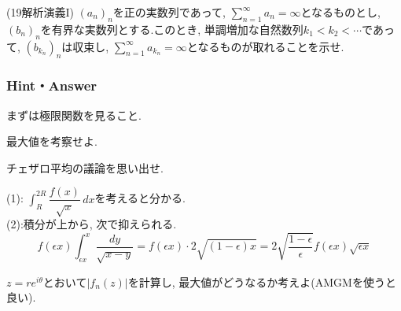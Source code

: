 \begin{prob} (19解析演義I)
$(a_n)_{n}$を正の実数列であって, $\sum_{n=1}^{\infty}a_n = \infty$となるものとし, $(b_n)_{n}$を有界な実数列とする.このとき, 単調増加な自然数列$k_1<k_2<\cdots$であって, $(b_{k_n})_{n}$は収束し, $\sum_{n=1}^{\infty}a_{k_n} = \infty$となるものが取れることを示せ.
\end{prob}

\newpage
\subsubsection{Hint・Answer}

{\small
\begin{probans}
まずは極限関数を見ること.
\end{probans}
\begin{probans}
最大値を考察せよ.
\end{probans}
\begin{probans}
チェザロ平均の議論を思い出せ.
\end{probans}
\begin{probans}
(1): $\int_{R}^{2R}\dfrac{f(x)}{\sqrt{x}}\, dx$を考えると分かる. \\
(2):積分が上から, 次で抑えられる.
\[f(\epsilon x) \int_{\epsilon x}^{x} \dfrac{dy}{\sqrt{x-y}} = f(\epsilon x)\cdot 2\sqrt{(1-\epsilon)x} = 2\sqrt{\frac{1-\epsilon}{\epsilon}}f(\epsilon x)\sqrt{\epsilon x}\]
\end{probans}




\begin{probans}
\end{probans}
\begin{probans}
\end{probans}
\begin{probans} %
\end{probans}

\begin{probans} %
$z=re^{i\theta}$とおいて$|f_n(z)|$を計算し, 最大値がどうなるか考えよ(AMGMを使うと良い).
\end{probans}

}

